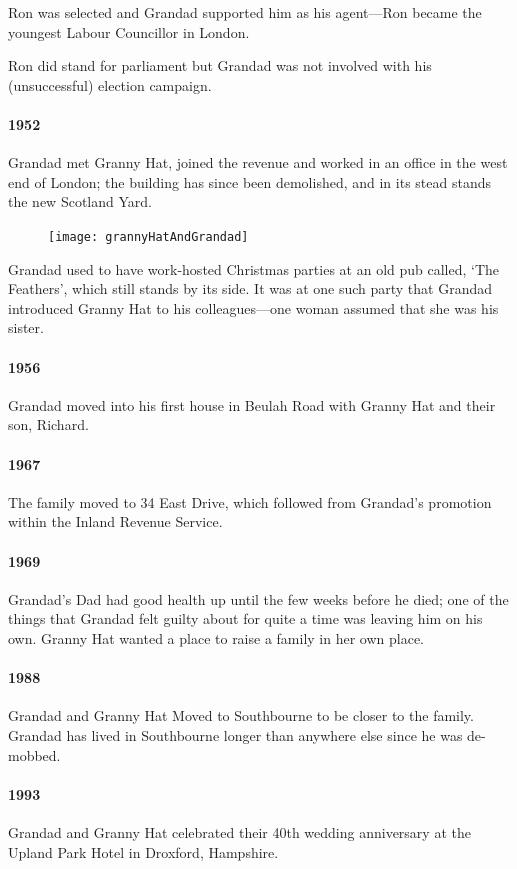 Ron was selected and Grandad supported him as his agent---Ron became
the youngest Labour Councillor in London.

Ron did stand for parliament but Grandad was not
involved with his (unsuccessful) election campaign.

\paragraph{1952} Grandad met Granny Hat, joined the revenue and worked in an office
in the west end of London; the building has since been demolished, and in its stead
stands the new Scotland Yard.

\begin{figure}
	\centering
	\texttt{[image: grannyHatAndGrandad]}
\end{figure}
Grandad used to have work-hosted Christmas parties at an old pub called, `The Feathers', which still stands by its side.
It was at one such party that Grandad introduced Granny Hat to his colleagues---one woman
assumed that she was his sister.

\paragraph{1956} Grandad moved into his first house in Beulah Road with Granny Hat and their son, Richard.
\paragraph{1967} The family moved to 34 East Drive, which followed from Grandad's promotion within
the Inland Revenue Service.
\paragraph{1969} Grandad's Dad had good health up until the few weeks before he died; one
of the things that Grandad felt guilty about for quite a time was leaving him on his own. Granny Hat  wanted
a place to raise a family in her own place.
\paragraph{1988} Grandad and Granny Hat Moved to Southbourne to be closer to the family. Grandad
has lived in Southbourne longer than anywhere else since he was de-mobbed.

\paragraph{1993} Grandad and Granny Hat celebrated their 40th wedding anniversary
at the Upland Park Hotel in Droxford, Hampshire.

